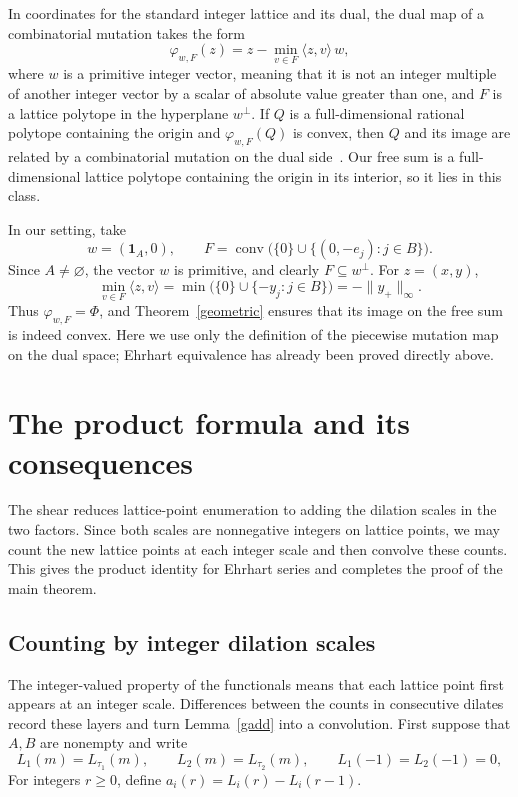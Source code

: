 \documentclass[11pt,reqno]{amsart}
\numberwithin{equation}{section}
\theoremstyle{definition}
\theoremstyle{remark}
\theoremstyle{definition}
\DeclareMathOperator{\conv}{conv}
\begin{document}
In coordinates for the standard integer lattice and its dual, the dual map of a combinatorial mutation takes the form~\cite[Section~3]{ACGK}~\cite[Definition~3.1]{HIG}
\begin{equation}\label{mutationmap}
 \varphi_{w,F}(z)=z-\min_{v\in F}\langle z,v\rangle\,w,
\end{equation}
where $w$ is a primitive integer vector, meaning that it is not an integer multiple of another integer vector by a scalar of absolute value greater than one, and $F$ is a lattice polytope in the hyperplane $w^\perp$. If $Q$ is a full-dimensional rational polytope containing the origin and $\varphi_{w,F}(Q)$ is convex, then $Q$ and its image are related by a combinatorial mutation on the dual side~\cite[Proposition~3.4 and Definition~3.5]{HIG}. Our free sum is a full-dimensional lattice polytope containing the origin in its interior, so it lies in this class.

In our setting, take
\[
 w=(\mathbf1_A,0),\qquad
 F=\conv\bigl(\{0\}\cup\{(0,-e_j):j\in B\}\bigr).
\]
Since $A\ne\varnothing$, the vector $w$ is primitive, and clearly $F\subseteq w^\perp$. For $z=(x,y)$,
\[
 \min_{v\in F}\langle z,v\rangle
       =\min\bigl(\{0\}\cup\{-y_j:j\in B\}\bigr)
       =-\|y_+\|_\infty.
\]
Thus $\varphi_{w,F}=\Phi$, and Theorem~\ref{geometric} ensures that its image on the free sum is indeed convex. Here we use only the definition of the piecewise mutation map on the dual space; Ehrhart equivalence has already been proved directly above.

\section{The product formula and its consequences}\label{sec:ehrhart}
The shear reduces lattice-point enumeration to adding the dilation scales in the two factors. Since both scales are nonnegative integers on lattice points, we may count the new lattice points at each integer scale and then convolve these counts. This gives the product identity for Ehrhart series and completes the proof of the main theorem.

\subsection{Counting by integer dilation scales}
The integer-valued property of the functionals means that each lattice point first appears at an integer scale. Differences between the counts in consecutive dilates record these layers and turn Lemma~\ref{gadd} into a convolution. First suppose that $A,B$ are nonempty and write
\[
L_1(m)=L_{\tau_1}(m),\qquad L_2(m)=L_{\tau_2}(m),
\qquad L_1(-1)=L_2(-1)=0,
\]
For integers $r\ge0$, define $a_i(r)=L_i(r)-L_i(r-1)$.
\end{document}
